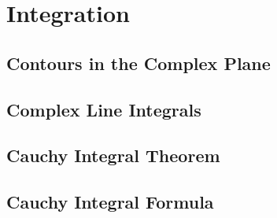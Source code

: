 \newpage
\section{Integration}

\subsection{Contours in the Complex Plane}

\subsection{Complex Line Integrals}

\subsection{Cauchy Integral Theorem}

\subsection{Cauchy Integral Formula}